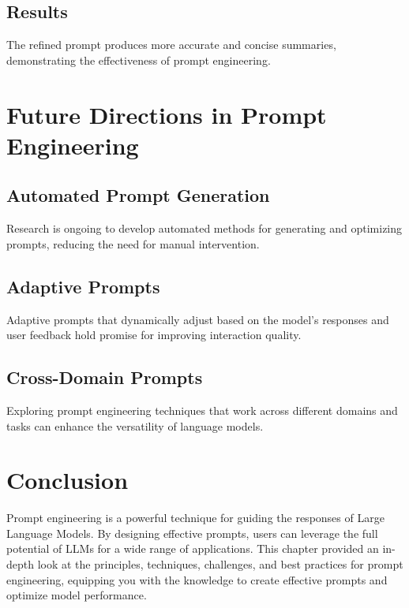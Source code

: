 \subsection{Results}
The refined prompt produces more accurate and concise summaries, demonstrating the effectiveness of prompt engineering.

\section{Future Directions in Prompt Engineering}

\subsection{Automated Prompt Generation}
Research is ongoing to develop automated methods for generating and optimizing prompts, reducing the need for manual intervention.

\subsection{Adaptive Prompts}
Adaptive prompts that dynamically adjust based on the model's responses and user feedback hold promise for improving interaction quality.

\subsection{Cross-Domain Prompts}
Exploring prompt engineering techniques that work across different domains and tasks can enhance the versatility of language models.

\section{Conclusion}
Prompt engineering is a powerful technique for guiding the responses of Large Language Models. By designing effective prompts, users can leverage the full potential of LLMs for a wide range of applications. This chapter provided an in-depth look at the principles, techniques, challenges, and best practices for prompt engineering, equipping you with the knowledge to create effective prompts and optimize model performance.


% 
% 
